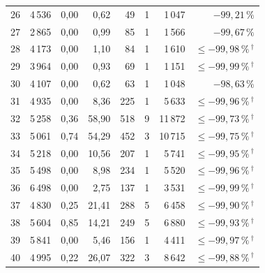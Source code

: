 \begin{longtable}{@{}r r r r r r r r@{}}
  26 & 4\,536 & 0{,}00 & 0{,}62 & 49 & 1 & 1\,047 & $-99{,}21\,\%$ \\
  27 & 2\,865 & 0{,}00 & 0{,}99 & 85 & 1 & 1\,566 & $-99{,}67\,\%$ \\
  28 & 4\,173 & 0{,}00 & 1{,}10 & 84 & 1 & 1\,610 & $\leq -99{,}98\,\%$\,$^{\dagger}$ \\
  29 & 3\,964 & 0{,}00 & 0{,}93 & 69 & 1 & 1\,151 & $\leq -99{,}99\,\%$\,$^{\dagger}$ \\
  30 & 4\,107 & 0{,}00 & 0{,}62 & 63 & 1 & 1\,048 & $-98{,}63\,\%$ \\
  31 & 4\,935 & 0{,}00 & 8{,}36 & 225 & 1 & 5\,633 & $\leq -99{,}96\,\%$\,$^{\dagger}$ \\
  32 & 5\,258 & 0{,}36 & 58{,}90 & 518 & 9 & 11\,872 & $\leq -99{,}73\,\%$\,$^{\dagger}$ \\
  33 & 5\,061 & 0{,}74 & 54{,}29 & 452 & 3 & 10\,715 & $\leq -99{,}75\,\%$\,$^{\dagger}$ \\
  34 & 5\,218 & 0{,}00 & 10{,}56 & 207 & 1 & 5\,741 & $\leq -99{,}95\,\%$\,$^{\dagger}$ \\
  35 & 5\,498 & 0{,}00 & 8{,}98 & 234 & 1 & 5\,520 & $\leq -99{,}96\,\%$\,$^{\dagger}$ \\
  36 & 6\,498 & 0{,}00 & 2{,}75 & 137 & 1 & 3\,531 & $\leq -99{,}99\,\%$\,$^{\dagger}$ \\
  37 & 4\,830 & 0{,}25 & 21{,}41 & 288 & 5 & 6\,458 & $\leq -99{,}90\,\%$\,$^{\dagger}$ \\
  38 & 5\,604 & 0{,}85 & 14{,}21 & 249 & 5 & 6\,880 & $\leq -99{,}93\,\%$\,$^{\dagger}$ \\
  39 & 5\,841 & 0{,}00 & 5{,}46 & 156 & 1 & 4\,411 & $\leq -99{,}97\,\%$\,$^{\dagger}$ \\
  40 & 4\,995 & 0{,}22 & 26{,}07 & 322 & 3 & 8\,642 & $\leq -99{,}88\,\%$\,$^{\dagger}$ \\
\end{longtable}
\endgroup
